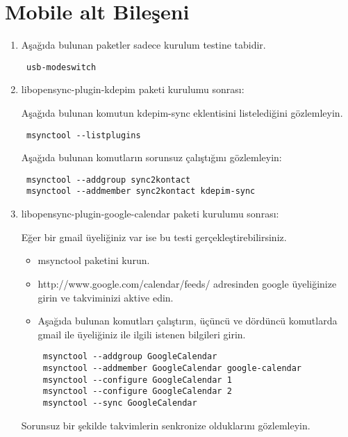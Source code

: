 \documentclass[a4paper,10pt]{article}
\begin{document}
\section{Mobile alt Bileşeni}
\begin{enumerate}
\item Aşağıda bulunan paketler sadece kurulum testine tabidir.
\begin{verbatim}
 usb-modeswitch
\end{verbatim}


\item libopensync-plugin-kdepim paketi kurulumu sonrası:

Aşağıda bulunan komutun kdepim-sync eklentisini listelediğini gözlemleyin.
\begin{verbatim}
 msynctool --listplugins
\end{verbatim}

Aşağıda bulunan komutların sorunsuz çalıştığını gözlemleyin:

\begin{verbatim}
 msynctool --addgroup sync2kontact
 msynctool --addmember sync2kontact kdepim-sync
\end{verbatim}


 \item libopensync-plugin-google-calendar paketi kurulumu sonrası:

Eğer bir gmail üyeliğiniz var ise bu testi gerçekleştirebilirsiniz.
\begin{itemize}
 \item msynctool paketini kurun.
 \item http://www.google.com/calendar/feeds/ adresinden google üyeliğinize girin ve takviminizi aktive edin.
 \item Aşağıda bulunan komutları çalıştırın, üçüncü ve dördüncü komutlarda gmail ile üyeliğiniz ile ilgili istenen bilgileri girin.

\begin{verbatim}
 msynctool --addgroup GoogleCalendar
 msynctool --addmember GoogleCalendar google-calendar
 msynctool --configure GoogleCalendar 1
 msynctool --configure GoogleCalendar 2
 msynctool --sync GoogleCalendar	
\end{verbatim}

\end{itemize}

Sorunsuz bir şekilde takvimlerin senkronize olduklarını gözlemleyin.	
\end{enumerate}
\end{document}
